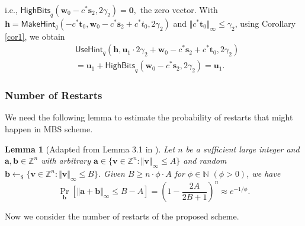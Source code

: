 \documentclass[conference]{IEEEtran}
\newtheorem{lemma}[theorem]{Lemma}
\begin{document}
	i.e., $\textsf{HighBits}_q(\mathbf{w}_0-c^*\mathbf{s}_2, 2\gamma_2)=\mathbf{0},$ the zero vector.
	With 
	$\mathbf{h}=\mathsf{MakeHint}_q(-c^*\mathbf{t}_0,\mathbf{w}_0-c^*\mathbf{s}_2+c^*t_0, 2\gamma_2)$ and $\Vert c^*\mathbf{t}_0\Vert_{\infty} \leq \gamma_2$, using Corollary \ref{cor1}, we obtain
\begin{equation*}
	\begin{split}
	&	\mathsf{UseHint}_q(\mathbf{h},\mathbf{u}_1\cdot 2\gamma_2 +\mathbf{w}_0-c^*\mathbf{s}_2+c^*\mathbf{t}_0,2\gamma_2)\\&=\mathbf{u}_1+\textsf{HighBits}_q(\mathbf{w}_0-c^*\mathbf{s}_2, 2\gamma_2)=\mathbf{u}_1.
	\end{split}
\end{equation*}
	
		\subsubsection{Number of Restarts} We need the following lemma to estimate the probability of restarts that might happen in \textsf{MBS} scheme.
	\begin{lemma} [Adapted from Lemma 3.1 in \cite{Ruc08}] \label{blindne}
		Let $n$ be a sufficient large integer and $\mathbf{a}, \mathbf{b} \in \mathbb{Z}^n$ with arbitrary $\mathbf{a} \in \{  \mathbf{v} \in \mathbb{Z}^n: \Vert  \mathbf{v}\Vert_{\infty}\leq A\}$ and random $\mathbf{b} \leftarrow_{\$} \{  \mathbf{v} \in \mathbb{Z}^n: \Vert  \mathbf{v}\Vert_{\infty}\leq B\}$. Given $B\geq n\cdot\phi \cdot A$ for $\phi \in \mathbb{N}$ $ (\phi >0)$, we have 
		$$\Pr_{\mathbf{b} }[\Vert \mathbf{a}+\mathbf{b} \Vert_{\infty} \leq B-A]=\left(1-\frac{2A}{2B+1} \right)^n \approx e^{-1/\phi}.$$
	\end{lemma}
	
	
	
 Now we consider the number of restarts of the proposed scheme. 
	
\end{document}
